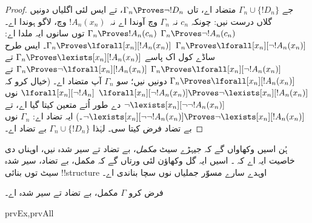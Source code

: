 \documentclass[../../../include/open-logic-section]{subfiles}
\begin{document}
\begin{proof}
جے $\Gamma_n \cup \{!D_n\}$ متضاد اے، تاں
$\Gamma_n \Proves \lnot !D_n$، تے ایس لئی
اگلیاں دونیں گلاں درست نیں:
چونکہ $c_n$ نہ
$\Gamma_n$ وچ آوندا اے نہ~$!A_n(x_n)$ وچ،
لاگو ہوندا اے۔
{$\Gamma_n \Proves \lnot !A_n(c_n)$}
{$\Gamma_n \Proves !A_n(c_n)$}
توں سانوں ایہ ملدا اے:
{$\Gamma_n \Proves \lforall[x_n][\lnot !A_n(x_n)]$}
{$\Gamma_n \Proves \lforall[x_n][!A_n(x_n)]$}۔
ایس طرح ساڈے کول اک پاسے
{$\Gamma_n \Proves \lexists[x_n][!A_n(x_n)]$ تے
$\Gamma_n \Proves \lforall[x_n][\lnot !A_n(x_n)]$}
{$\Gamma_n \Proves \lnot\lforall[x_n][!A_n(x_n)]$ تے
$\Gamma_n \Proves \lforall[x_n][!A_n(x_n)]$}
دونیں نیں؛ سو $\Gamma_n$ آپ متضاد اے۔
{(خیال کرو کہ
{$\lforall[x_n][\lnot !A_n(x_n)] \Proves
  \lnot\lexists[x_n][!A_n(x_n)]$}
{$\lforall[x_n][\lnot !A_n]$ نوں
  $\lnot\lexists[x_n][\lnot\lnot !A_n(x_n)]$ دے طور اُتے
  متعین کیتا گیا اے، تے
  $\lnot\lexists[x_n][\lnot\lnot !A_n(x_n)] \Proves
  \lnot\lexists[x_n][!A_n(x_n)]$}۔)}{}
ایہ تضاد اے: $\Gamma_n$ نوں بے تضاد فرض کیتا سی۔
لہٰذا $\Gamma_n \cup \{ !D_n\}$ بے تضاد اے۔
\end{proof}

\begin{explain}
ہُن اسیں وکھاواں گے کہ جیہڑے سیٹ
\emph{مکمل}، بے تضاد تے سیر شدہ نیں، اوہناں دی
خاصیت ایہ اے کہ ۔ اسیں ایہ گل وکھاؤن لئی ورتاں گے
کہ مکمل، بے تضاد، سیر شدہ سیٹ توں بنائی
!!{structure} اوہدے سارے مسوّر جملیاں نوں سچا
بناندی اے۔
\end{explain}

\begin{prop}
فرض کرو $\Gamma$ مکمل، بے تضاد تے سیر شدہ اے۔
\begin{tagenumerate}{prvEx,prvAll}
\end{tagenumerate}
\end{prop}
\end{document}
